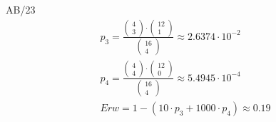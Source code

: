 \begin{exercise}{AB/23}
  \begin{gather*}
    p_3 = \frac{\begin{pmatrix}4 \\ 3\end{pmatrix} \cdot \begin{pmatrix}12 \\ 1\end{pmatrix}}{\begin{pmatrix}16 \\ 4\end{pmatrix}} \approx 2.6374 \cdot 10^{-2} \\
    p_4 = \frac{\begin{pmatrix}4 \\ 4\end{pmatrix} \cdot \begin{pmatrix}12 \\ 0\end{pmatrix}}{\begin{pmatrix}16 \\ 4\end{pmatrix}} \approx 5.4945 \cdot 10^{-4} \\
    Erw = 1 - (10 \cdot p_3 + 1000 \cdot p_4) \approx 0.19
  \end{gather*}
\end{exercise}
